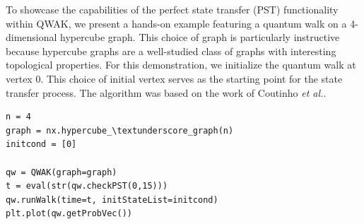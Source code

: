 \documentclass[main.tex]{subfiles}
\begin{document}
%
%
%
%
%
%

To showcase the capabilities of the perfect state transfer (PST) functionality
within QWAK, we present a hands-on example featuring a quantum walk on a
4-dimensional hypercube graph. This choice of graph is particularly instructive
because hypercube graphs are a well-studied class of graphs with interesting
topological properties. For this demonstration, we initialize the quantum walk
at vertex $0$. This choice of initial vertex serves as the starting point for
the state transfer process. The algorithm was based on the work of Coutinho \textit{et al.}\cite{coutinho17}.

\begin{lstlisting}[style=code,escapeinside={__}]
n = 4
graph = nx.hypercube_\textunderscore_graph(n)
initcond = [0]

qw = QWAK(graph=graph)
t = eval(str(qw.checkPST(0,15)))
qw.runWalk(time=t, initStateList=initcond)
plt.plot(qw.getProbVec())
\end{lstlisting}
\end{document}
